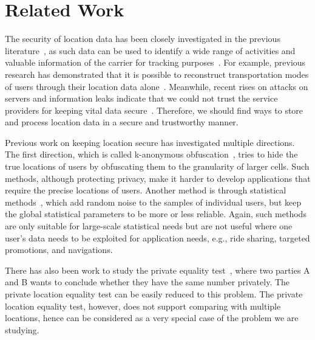 \section{Related Work}
\label{sec:related}

The security of location data has been closely investigated in the previous literature~\cite{fawaz2014location,gibler2012androidleaks}, as such data can be used to identify a wide range of activities and valuable information of the carrier for tracking purposes~\cite{farrahi2010probabilistic}. For example, previous research has demonstrated that it is possible to reconstruct transportation modes of users through their location data alone~\cite{bierlaire2013probabilistic}. Meanwhile, recent rises on attacks on servers and information leaks indicate that we could not trust the service providers for keeping vital data secure~\cite{vasek2016hacking}. Therefore, we should find ways to store and process location data in a secure and trustworthy manner.

Previous work on keeping location secure has investigated multiple directions. The first direction, which is called k-anonymous obfuscation~\cite{casino2015k,phan2015kur}, tries to hide the true locations of users by obfuscating them to the granularity of larger cells. Such methods, although protecting privacy, make it harder to develop applications that require the precise locations of users. Another method is through statistical methods~\cite{seidl2015spatial}, which add random noise to the samples of individual users, but keep the global statistical parameters to be more or less reliable. Again, such methods are only suitable for large-scale statistical needs but are not useful where one user's data needs to be exploited for application needs, e.g., ride sharing, targeted promotions, and navigations. 

There has also been work to study the private equality test~\cite{kotzanikolaou2016lightweight, patsakis2015private}, where two parties A and B wants to conclude whether they have the same number privately. The private location equality test can be easily reduced to this problem. The private location equality test, however, does not support comparing with multiple locations, hence can be considered as a very special case of the problem we are studying. 

